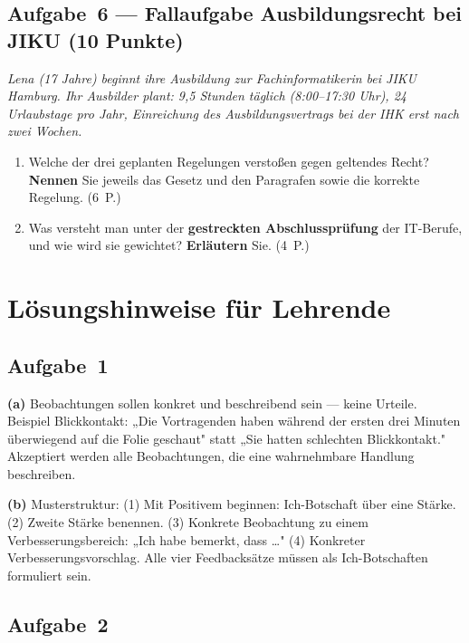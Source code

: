 \documentclass[11pt, a4paper]{article}
\begin{document}
\subsection*{Aufgabe~6 --- Fallaufgabe Ausbildungsrecht bei JIKU (10 Punkte)}

\textit{Lena (17 Jahre) beginnt ihre Ausbildung zur Fachinformatikerin bei JIKU Hamburg.
Ihr Ausbilder plant: 9,5 Stunden täglich (8:00--17:30 Uhr), 24 Urlaubstage pro Jahr,
Einreichung des Ausbildungsvertrags bei der IHK erst nach zwei Wochen.}

\begin{enumerate}[label=(\alph*)]
  \item Welche der drei geplanten Regelungen verstoßen gegen geltendes Recht?
  \textbf{Nennen} Sie jeweils das Gesetz und den Paragrafen sowie die korrekte Regelung. \hfill (6~P.)

  \vspace{8cm}

  \item Was versteht man unter der \textbf{gestreckten Abschlussprüfung} der IT-Berufe,
  und wie wird sie gewichtet? \textbf{Erläutern} Sie. \hfill (4~P.)

  \vspace{6cm}
\end{enumerate}

\newpage
\section*{Lösungshinweise für Lehrende}\label{loesungen}

\subsection*{Aufgabe~1}

\textbf{(a)} Beobachtungen sollen konkret und beschreibend sein --- keine Urteile.
Beispiel Blickkontakt: „Die Vortragenden haben während der ersten drei Minuten überwiegend
auf die Folie geschaut" statt „Sie hatten schlechten Blickkontakt."
Akzeptiert werden alle Beobachtungen, die eine wahrnehmbare Handlung beschreiben.

\textbf{(b)} Musterstruktur: (1) Mit Positivem beginnen: Ich-Botschaft über eine Stärke.
(2) Zweite Stärke benennen. (3) Konkrete Beobachtung zu einem Verbesserungsbereich:
„Ich habe bemerkt, dass \ldots" (4) Konkreter Verbesserungsvorschlag.
Alle vier Feedbacksätze müssen als Ich-Botschaften formuliert sein.

\subsection*{Aufgabe~2}
\end{document}
